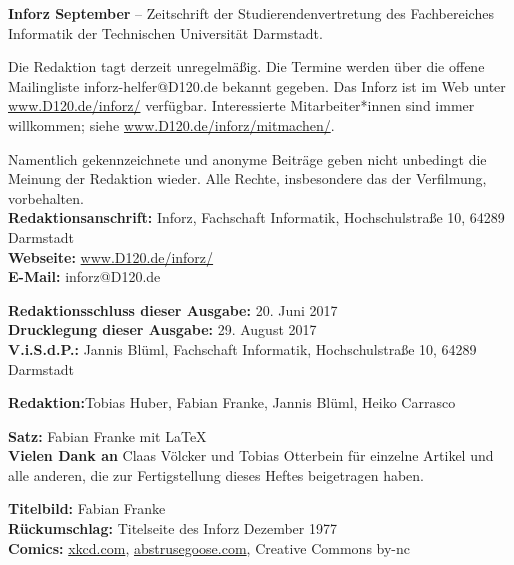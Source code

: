 \vfill
{}
\small

\textbf{Inforz September \the\year} – Zeitschrift der Studierendenvertretung des Fachbereiches Informatik der Technischen Universität Darmstadt.

\vspace{3mm}
Die Redaktion tagt derzeit unregelmäßig. Die Termine werden über die offene Mailingliste inforz-helfer@D120.de bekannt gegeben. Das Inforz ist  im Web unter \url{www.D120.de/inforz/} verfügbar. Interessierte Mitarbeiter*innen sind immer willkommen; siehe  \url{www.D120.de/inforz/mitmachen/}.

\vspace{3mm}
Namentlich gekennzeichnete und anonyme Beiträge geben nicht unbedingt die Meinung der Redaktion wieder. Alle Rechte, insbesondere das der Verfilmung, vorbehalten. \\


\textbf{Redaktionsanschrift:} Inforz, Fachschaft Informatik, Hochschulstraße 10, 64289 Darmstadt\\
\textbf{Webseite:} \url{www.D120.de/inforz/}\\
\textbf{E-Mail:} inforz@D120.de

\vspace{3mm}
\textbf{Redaktionsschluss dieser Ausgabe:} 20. Juni 2017\\
\textbf{Drucklegung dieser Ausgabe:} 29. August 2017 \\
\textbf{V.i.S.d.P.:} Jannis Blüml, Fachschaft Informatik, Hochschulstraße 10, 64289 Darmstadt

\vspace{3mm}
\textbf{Redaktion:}Tobias Huber, Fabian Franke, Jannis Blüml, Heiko Carrasco

\vspace{3mm}
\textbf{Satz:} Fabian Franke mit \LaTeX\\

\vspace{3mm}
\textbf{Vielen Dank an} Claas Völcker und Tobias Otterbein für einzelne Artikel und alle anderen, die zur Fertigstellung dieses Heftes beigetragen haben.

\vspace{3mm}
\textbf{Titelbild:} Fabian Franke \\
\textbf{Rückumschlag:} Titelseite des Inforz Dezember 1977 \\
\textbf{Comics:} \url{xkcd.com}, \url{abstrusegoose.com}, Creative Commons by-nc

